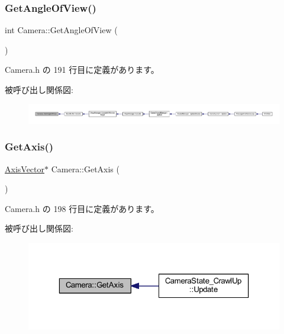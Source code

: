\subsubsection{\texorpdfstring{Get\+Angle\+Of\+View()}{GetAngleOfView()}}
{\footnotesize\ttfamily int Camera\+::\+Get\+Angle\+Of\+View (\begin{DoxyParamCaption}{ }\end{DoxyParamCaption})\hspace{0.3cm}{\ttfamily [inline]}}



 Camera.\+h の 191 行目に定義があります。

被呼び出し関係図\+:
\nopagebreak
\begin{figure}[H]
\begin{center}
\leavevmode
\includegraphics[width=350pt]{class_camera_a9d54f574c141e6007d98ccd905501632_icgraph}
\end{center}
\end{figure}
\mbox{\label{class_camera_a62c4371143e87e34c70d27f2728987d9}} 
\subsubsection{\texorpdfstring{Get\+Axis()}{GetAxis()}}
{\footnotesize\ttfamily \mbox{\hyperlink{class_axis_vector}{Axis\+Vector}}$\ast$ Camera\+::\+Get\+Axis (\begin{DoxyParamCaption}{ }\end{DoxyParamCaption})\hspace{0.3cm}{\ttfamily [inline]}}



 Camera.\+h の 198 行目に定義があります。

被呼び出し関係図\+:
\nopagebreak
\begin{figure}[H]
\begin{center}
\leavevmode
\includegraphics[width=323pt]{class_camera_a62c4371143e87e34c70d27f2728987d9_icgraph}
\end{center}
\end{figure}
\mbox{\label{class_camera_a47e72bd04f7aaac1657d7bce5322b97c}} 
